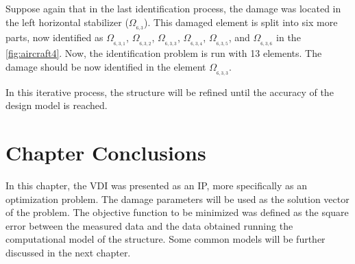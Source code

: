 Suppose again that in the last identification process, the damage was located in the left horizontal stabilizer ($\Omega_{_{6,3}}$). This damaged element is split into six more parts, now identified as $\Omega_{_{6,3,1}}$, $\Omega_{_{6,3,2}}$, $\Omega_{_{6,3,3}}$, $\Omega_{_{6,3,4}}$, $\Omega_{_{6,3,5}}$, and $\Omega_{_{6,3,6}}$ in the \autoref{fig:aircraft4}. Now, the identification problem is run with 13 elements. The damage should be now identified in the element $\Omega_{_{6,3,3}}$.

In this iterative process, the structure will be refined until the accuracy of the design model is reached.

\section{Chapter Conclusions}

In this chapter, the VDI was presented as an IP, more specifically as an optimization problem. The damage parameters will be used as the solution vector of the problem. The objective function to be minimized was defined as the square error between the measured data and the data obtained running the computational model of the structure. Some common models will be further discussed in the next chapter.